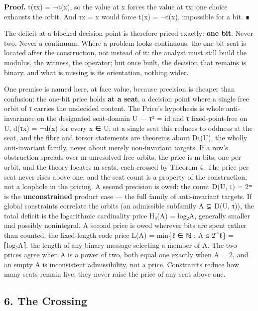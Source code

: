 \documentclass[10pt]{article}
\renewcommand{\_}{\origunderscore\allowbreak}
\begin{document}
\textbf{Proof.} t(τx) = ¬t(x), so the value at x forces the value at τx;
one choice exhausts the orbit. And τx = x would force t(x) = ¬t(x),
impossible for a bit. ∎

The deficit at a blocked decision point is therefore priced exactly:
\textbf{one bit}. Never two. Never a continuum. Where a problem looks
continuous, the one-bit seat is located after the construction, not
instead of it: the analyst must still build the modulus, the witness,
the operator; but once built, the decision that remains is binary, and
what is missing is its orientation, nothing wider.

One premise is named here, at face value, because precision is cheaper
than confusion: the one-bit price holds \textbf{at a seat}, a decision
point where a single free orbit of τ carries the undecided content. The
Price's hypothesis is whole anti-invariance on the designated
seat-domain U --- τ² = id and τ fixed-point-free on U, d(τx) = ¬d(x) for
every x ∈ U; at a single seat this reduces to oddness at the seat, and
the fibre and torsor statements are theorems about Dτ(U), the wholly
anti-invariant family, never about merely non-invariant targets. If a
row's obstruction spreads over m unresolved free orbits, the price is m
bits, one per orbit, and the theory locates m seats, each crossed by
Theorem 4. The price per seat never rises above one, and the seat count
is a property of the construction, not a loophole in the pricing. A
second precision is owed: the count \textbar D(U, τ)\textbar{} = 2ᵐ is
the \textbf{unconstrained} product case --- the full family of
anti-invariant targets. If global constraints correlate the orbits (an
admissible subfamily A ⊊ D(U, τ)), the total deficit is the logarithmic
cardinality price H₀(A) = log₂\textbar A\textbar, generally smaller and
possibly nonintegral. A second price is owed wherever bits are spent
rather than counted: the fixed-length code price L(A) = min\{ℓ ∈ ℕ :
\textbar A\textbar{} ≤ 2\^{}ℓ\} = ⌈log₂\textbar A\textbar⌉, the length
of any binary message selecting a member of A. The two prices agree when
\textbar A\textbar{} is a power of two, both equal one exactly when
\textbar A\textbar{} = 2, and an empty A is inconsistent admissibility,
not a price. Constraints reduce how many seats remain live; they never
raise the price of any seat above one.

\hypertarget{the-crossing}{%
\subsection{6. The Crossing}\label{the-crossing}}
\end{document}
